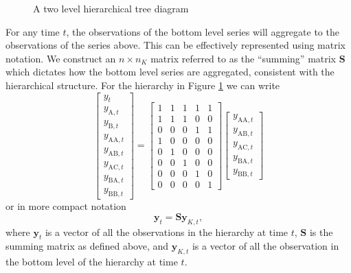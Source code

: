 \documentclass[nojss]{jss}
\def\pred#1#2#3{#1_{\text{#2},#3}}
\def\y#1#2{\pred{y}{#1}{#2}}
\begin{document}
\begin{figure}[!htb]
\caption{A two level hierarchical tree diagram}\label{fig-9-4-hier}
\centering
{}
\end{figure}

For any time $t$, the observations of the bottom level series will aggregate to the observations of the series above. This can be effectively represented using matrix notation. We construct an $n\times n_K$ matrix referred to as the ``summing'' matrix $\bm{S}$ which dictates how the bottom level series are aggregated, consistent with the hierarchical structure. For the hierarchy in Figure \ref{fig-9-4-hier} we can write
\[
{\left[
  \begin{array}{c}
  y_{t} \\
  \y{A}{t} \\
  \y{B}{t} \\
  \y{AA}{t} \\
  \y{AB}{t} \\
  \y{AC}{t} \\
  \y{BA}{t} \\
  \y{BB}{t}
  \end{array}
  \right] }
=
{\left[\begin{array}{ccccc}
       1 & 1 & 1 & 1 & 1 \\
       1 & 1 & 1 & 0 & 0 \\
       0 & 0 & 0 & 1 & 1 \\
       1  & 0  & 0  & 0  & 0  \\
       0  & 1  & 0  & 0  & 0  \\
       0  & 0  & 1  & 0  & 0  \\
       0  & 0  & 0  & 1  & 0  \\
       0  & 0  & 0  & 0  & 1
       \end{array}
       \right] }
{\left[
  \begin{array}{c}
  \y{AA}{t} \\
  \y{AB}{t} \\
  \y{AC}{t} \\
  \y{BA}{t} \\
  \y{BB}{t}
  \end{array}
  \right]}
\]
or in more compact notation
\[
  \bm{y}_t=\bm{S}\bm{y}_{K,t},
\]
where $\bm{y}_t$ is a vector of all the observations in the hierarchy at time $t$, $\bm{S}$ is the summing matrix as defined above, and $\bm{y}_{K,t}$ is a vector of all the observation in the bottom level of the hierarchy at time $t$.
\end{document}
